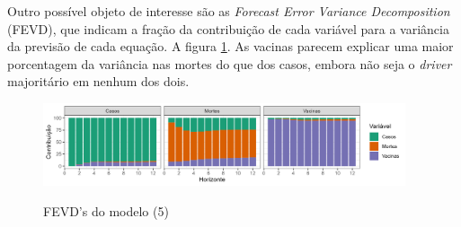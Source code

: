 \documentclass[
    article,
	12pt,				%
	oneside,			%
	a4paper,			%
	english,			%
	brazil,				%
	hyperref = {colorlinks, citecolor=c1d, linkcolor=c2d, urlcolor=c3d, colorlinks}
	]{abntex2}
\newcounter{j}
\begin{document}
\begin{apendicesenv}
Outro possível objeto de interesse são as \textit{Forecast Error Variance Decomposition} (FEVD), que indicam a fração da contribuição de cada variável para a variância da previsão de cada equação. A figura \ref{fig:apfevd}. As vacinas parecem explicar uma maior porcentagem da variância nas mortes do que dos casos, embora não seja o \textit{driver} majoritário em nenhum dos dois.

\begin{figure}[H]
    \centering
    \caption{FEVD's do modelo (5)}
    \includegraphics[width = 0.95\textwidth]{Figures/ap_fevd.png}
    \label{fig:apfevd}
\end{figure}

\newpage %


\end{apendicesenv}
\end{document}
